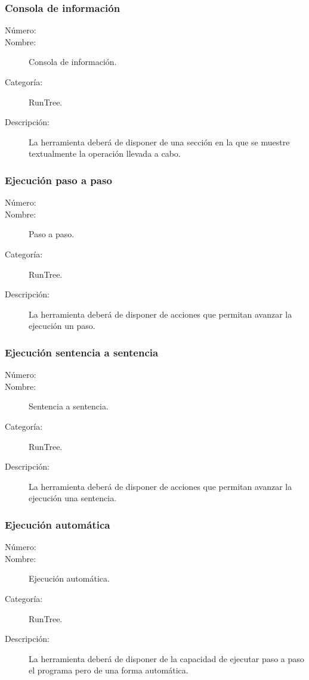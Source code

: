 \subsubsection{Consola de información}
	\begin{description}
		\item [Número:] \cn
		\item [Nombre:] Consola de información.
		\item [Categoría:] RunTree.
		\item [Descripción:] La herramienta deberá de disponer de una sección en la que se muestre textualmente la operación llevada a cabo.
	\end {description}

\subsubsection{Ejecución paso a paso}
	\begin{description}
		\item [Número:] \cn
		\item [Nombre:] Paso a paso.
		\item [Categoría:] RunTree.
		\item [Descripción:] La herramienta deberá de disponer de acciones que permitan avanzar la ejecución un paso.
	\end {description}

\subsubsection{Ejecución sentencia a sentencia}
	\begin{description}
		\item [Número:] \cn
		\item [Nombre:] Sentencia a sentencia.
		\item [Categoría:] RunTree.
		\item [Descripción:] La herramienta deberá de disponer de acciones que permitan avanzar la ejecución una sentencia.
	\end {description}

\subsubsection{Ejecución automática}
	\begin{description}
		\item [Número:] \cn
		\item [Nombre:] Ejecución automática.
		\item [Categoría:] RunTree.
		\item [Descripción:] La herramienta deberá de disponer de la capacidad de ejecutar paso a paso el programa pero de una forma automática.
	\end {description}


